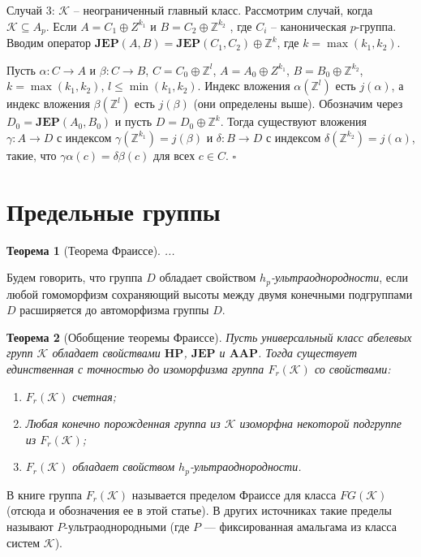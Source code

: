 \documentclass[12pt]{extarticle} %
\newtheorem{theorem}{Теорема}[section]
\def\proof{{\noindent{\bf Доказательство.}} }
\def\K{{\mathcal{K}}}
\def\Z{{\mathbb{Z}}}
\def\HP{\textbf{HP}}
\def\JEP{\textbf{JEP}}
\def\AAP{\textbf{AAP}}
\begin{document}
Случай 3: $\K$ -- неограниченный главный класс. Рассмотрим случай, когда $\K \subseteq A_p$. Если $A = C_1 \oplus Z^{k_1}$ и $B = C_2 \oplus \Z^{k_2}$ , где $C_i$ -- каноническая $p$-группа. Вводим оператор $\JEP(A, B) = \JEP(C_1, C_2) \oplus \Z^k$, где $k = \max(k_1, k_2)$.

Пусть $\alpha: C \rightarrow A$ и $\beta: C \rightarrow B$, $C = C_0 \oplus \Z^l$, $A = A_0 \oplus Z^{k_1}$, $B = B_0 \oplus \Z^{k_2}$, $k = \max(k_1, k_2)$, $l \leq \min(k_1, k_2)$. Индекс вложения $\alpha(\Z^l)$ есть $j(\alpha)$, а индекс вложения $\beta(\Z^l)$ есть $j(\beta)$ (они определены выше). Обозначим через $D_0 = \JEP(A_0, B_0)$ и пусть $D = D_0 \oplus \Z^k$. Тогда существуют вложения $\gamma: A \rightarrow D$ с индексом $\gamma(\Z^{k_1}) = j(\beta)$ и $\delta: B \rightarrow D$ с индексом $\delta(\Z^{k_2}) = j(\alpha)$, такие, что $\gamma\alpha(c) = \delta\beta(c)$ для всех $c \in C$. $\square$


\section{Предельные группы}

\begin{theorem}[Теорема Фраиссе]
...
\end{theorem}

Будем говорить, что группа $D$ обладает свойством \textit{$h_p$-ультраоднородности}, если любой гомоморфизм сохраняющий высоты между двумя конечными подгруппами $D$ расширяется до автоморфизма группы $D$.

\begin{theorem}[Обобщение теоремы Фраиссе]\label{th:Fraisse}
Пусть универсальный класс абелевых групп $\K$ обладает свойствами $\HP$, $\JEP$ и $\AAP$. Тогда существует единственная с точностью до изоморфизма группа $F_r(\K)$ со свойствами:
\begin{enumerate}
\item $F_r(\K)$ счетная;
\item Любая конечно порожденная группа из $\K$ изоморфна некоторой подгруппе из $F_r(\K)$;
\item $F_r(\K)$ обладает свойством $h_p$-ультраоднородности.
\end{enumerate}
\end{theorem}

\proof {}

В книге \cite{Hodges} группа $F_r(\K)$ называется пределом Фраиссе для класса $FG(\K)$ (отсюда и обозначения ее в этой статье). В других источниках такие пределы называют $P$-ультраоднородными (где $P$ --- фиксированная амальгама из класса систем $\K$).
\end{document}
